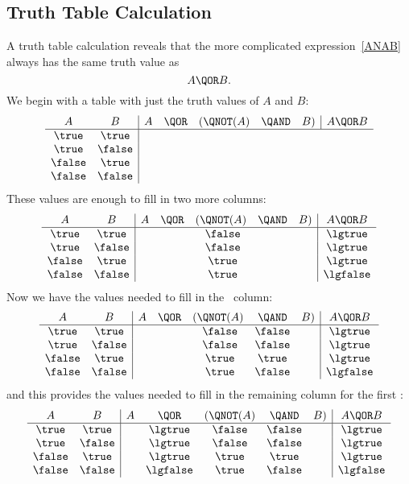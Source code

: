 \subsection{Truth Table Calculation}\label{truthtablecalc}
A truth table calculation reveals that the more complicated
expression~\ref{ANAB} always has the same truth value as
\begin{equation}\label{AOB}
A \QOR B.
\end{equation}
We begin with a table with just the truth values of $A$ and $B$:
\[
\begin{array}{cc|ccccc|c}
A      & B      & A  & \QOR  & (\QNOT(A)& \QAND & B) & A \QOR  B \\ \hline
\true  & \true \\
\true  & \false\\
\false & \true \\
\false & \false                       
\end{array}
\]
These values are enough to fill in two more columns:
\[
\begin{array}{cc|ccccc|c}
A      & B      & A & \QOR  & (\QNOT(A) & \QAND & B) & A \QOR  B \\ \hline
\true  & \true  &   &       & \ \false   &       &    & \lgtrue \\
\true  & \false &   &       & \ \false   &       &    & \lgtrue \\
\false & \true  &   &       & \ \true    &       &    & \lgtrue \\
\false & \false &   &       & \ \true    &       &    & \lgfalse\\
\end{array}
\]
Now we have the values needed to fill in the \QAND\ column:
\[
\begin{array}{cc|ccccc|c}
A      & B      & A & \QOR  & (\QNOT(A) & \QAND   & B) & A \QOR  B \\ \hline
\true  & \true  &   &       & \ \false   &  \false &    & \lgtrue \\
\true  & \false &   &       & \ \false   &  \false &    & \lgtrue \\
\false & \true  &   &       & \ \true    &  \true  &    & \lgtrue \\
\false & \false &   &       & \ \true    &  \false &    & \lgfalse\\
\end{array}
\]
and this provides the values needed to fill in the remaining column for the first \QOR:
\[
\begin{array}{cc|ccccc|c}
A      & B      & A & \QOR     &(\QNOT(A) & \QAND   & B) & A \QOR  B \\ \hline
\true  & \true  &   & \lgtrue  & \false &    \false &    & \lgtrue \\
\true  & \false &   & \lgtrue  & \false &    \false &    & \lgtrue \\
\false & \true  &   & \lgtrue  & \true  &    \true  &    & \lgtrue \\
\false & \false &   & \lgfalse & \true  &    \false &    & \lgfalse\\
\end{array}
\]

